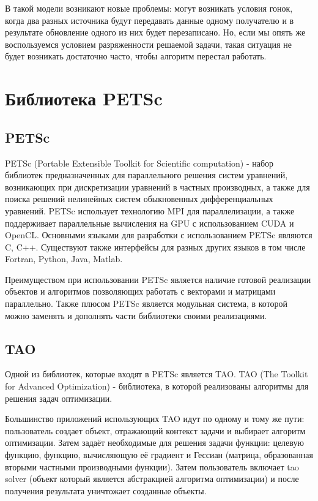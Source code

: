 \documentclass[12pt]{report}
\begin{document}
  В такой модели возникают новые проблемы: могут возникать условия гонок, когда
  два разных источника будут передавать данные одному получателю и в результате
  обновление одного из них будет перезаписано. Но, если мы опять же воспользуемся
  условием разряженности решаемой задачи, такая ситуация не будет возникать достаточно
  часто, чтобы алгоритм перестал работать.


  \chapter{Библиотека PETSc}
  \section{PETSc}
  PETSc (Portable Extensible Toolkit for Scientific computation) - набор
  библиотек предназначенных для параллельного решения систем уравнений,
  возникающих при дискретизации уравнений в частных производных, а также для
  поиска решений нелинейных систем обыкновенных дифференциальных уравнений.
  PETSc использует технологию MPI для параллелизации, а также поддерживает
  параллельные вычисления на GPU с использованием CUDA и OpenCL. Основными
  языками для разработки с использованием PETSc являются C, C++.
  Существуют также интерфейсы для разных других языков в том числе Fortran,
  Python, Java, Matlab.

  Преимуществом при использовании PETSc является наличие готовой реализации
  объектов и алгоритмов позволяющих работать с векторами и матрицами параллельно.
  Также плюсом PETSc является модульная система, в которой можно заменять и
  дополнять части библиотеки своими реализациями.

  \section{TAO}
  Одной из библиотек, которые входят в PETSc является TAO. TAO (The Toolkit for
  Advanced Optimization) - библиотека, в которой реализованы алгоритмы для
  решения задач оптимизации.

  Большинство приложений использующих TAO идут по одному и тому же пути: пользователь
  создает объект, отражающий контекст задачи и выбирает алгоритм оптимизации.
  Затем задаёт необходимые для решения задачи функции: целевую функцию, функцию,
  вычисляющую её градиент и Гессиан (матрица, образованная вторыми частными
  производными функции). Затем пользователь включает tao solver (объект который
  является абстракцией алгоритма оптимизации) и после получения результата уничтожает
  созданные объекты.
\end{document}
